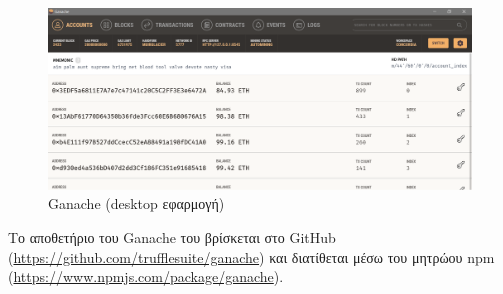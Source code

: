 \begin{figure}[H]
	\centering
	\includegraphics[width=.95\textwidth]{assets/figures/chapter-4/4.3.ganache-gui}
	\caption{Ganache (desktop εφαρμογή)}
\end{figure}

Το αποθετήριο του Ganache του βρίσκεται στο GitHub (\url{https://github.com/trufflesuite/ganache}) και διατίθεται μέσω του μητρώου npm (\url{https://www.npmjs.com/package/ganache}).
